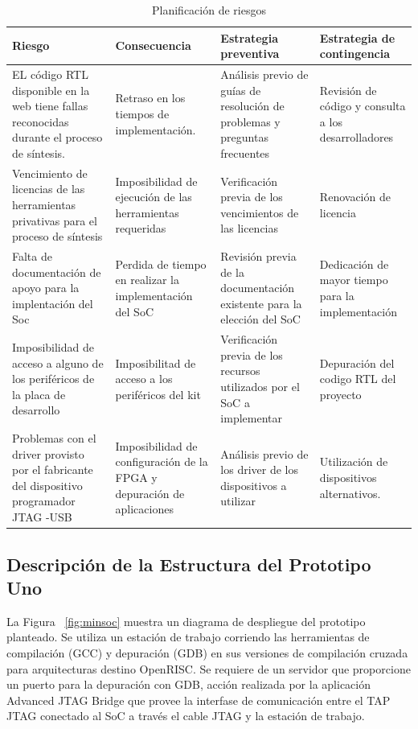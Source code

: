  \begin{table}[h!]
		\centering
		\begin{tabular}{ p{4cm} p{4cm} p{4cm} p{3cm} }
		\hline 
		\rowcolor[gray]{0.8} Riesgo & Consecuencia & Estrategia preventiva & Estrategia de contingencia\\
		\hline
		EL código RTL disponible en la web tiene fallas reconocidas durante el proceso de síntesis.&Retraso en los tiempos de implementación.& Análisis previo de guías de resolución de problemas y preguntas frecuentes & Revisión de código y consulta a los desarrolladores \\
		\hline
		Vencimiento de licencias de las herramientas privativas para el proceso de síntesis & Imposibilidad de ejecución de las herramientas requeridas & Verificación previa de los vencimientos de las licencias & Renovación de licencia \\	 
		\hline
		Falta de documentación de apoyo para la implentación
del Soc& Perdida de tiempo en realizar la implementación
del SoC & Revisión previa de la documentación existente para la elección del
SoC & Dedicación de mayor tiempo para la implementación\\ 
		\hline
		 Imposibilidad de acceso a alguno de los periféricos de la placa de desarrollo & Imposibilitad de acceso a los periféricos del kit &Verificación previa de los recursos utilizados por el SoC a implementar & Depuración del codigo RTL del proyecto\\		
		\hline
		Problemas con el driver provisto por el fabricante del  dispositivo programador JTAG -USB  & Imposibilidad de configuración de la FPGA y depuración de aplicaciones &Análisis previo de los driver de los dispositivos a utilizar &  Utilización de dispositivos alternativos.\\		
		\hline
		\end{tabular}
		\caption{Planificación de riesgos}
		\end{table}



\newpage
		\subsection{Descripción de la Estructura del Prototipo Uno}
			

		La Figura ~\ref{fig:minsoc} muestra un diagrama de despliegue del prototipo planteado. Se utiliza un estación de trabajo corriendo las herramientas de compilación (GCC) y depuración (GDB) en sus versiones de compilación cruzada para arquitecturas destino OpenRISC. Se requiere de un
		servidor que proporcione un puerto para la depuración con GDB, acción realizada por la aplicación Advanced JTAG Bridge que provee la interfase de comunicación entre el TAP JTAG conectado al SoC a través el cable JTAG y la estación de trabajo.
		
